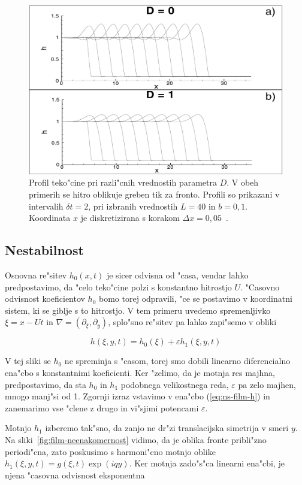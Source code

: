 \documentclass[a4paper,10pt]{article}
\newcommand{\eps}{\varepsilon}
\begin{document}
\begin{figure}[h]
 \centering
 \includegraphics[width=.8\textwidth]{./Slike/film-osnovna-resitev}
 \caption{Profil teko"cine pri razli"cnih vrednostih parametra $D$. V obeh primerih se hitro oblikuje greben tik za fronto. Profili so prikazani v intervalih $\delta t = 2$, pri izbranih vrednostih $L = 40$ in $b=0,1$. Koordinata $x$ je diskretizirana s korakom $\Delta x = 0,05$~\cite{kondic}. }
 \label{fig:film-osnovna}
\end{figure}


\subsection{Nestabilnost}

Osnovna re"sitev $h_0(x, t)$ je sicer odvisna od "casa, vendar lahko predpostavimo, da "celo teko"cine polzi s konstantno hitrostjo $U$. "Casovno odvisnost koeficientov $h_0$ bomo torej odpravili, "ce se postavimo v koordinatni sistem, ki se giblje s to hitrostjo. V tem primeru uvedemo spremenljivko $\xi = x - Ut$ in $\nabla = (\partial_\xi, \partial_y)$, splo"sno re"sitev pa lahko zapi"semo v obliki

\begin{equation}
 h(\xi, y, t) = h_0(\xi) + \eps h_1(\xi, y, t)
\end{equation}

V tej sliki se $h_0$ ne spreminja s "casom, torej smo dobili linearno diferencialno ena"cbo s konstantnimi koeficienti. Ker "zelimo, da je motnja res majhna, predpostavimo, da sta $h_0$ in $h_1$ podobnega velikostnega reda, $\eps$ pa zelo majhen, mnogo manj"si od 1. Zgornji izraz vstavimo v ena"cbo (\ref{eq:ns-film-h}) in zanemarimo vse "clene z drugo in vi"sjimi potencami $\eps$. 

Motnjo $h_1$ izberemo tak"sno, da zanjo ne dr"zi translacijska simetrija v smeri $y$. Na sliki~\ref{fig:film-neenakomernost} vidimo, da je oblika fronte pribli"zno periodi"cna, zato poskusimo s harmoni"cno motnjo oblike $h_1(\xi, y, t) = g(\xi, t) \exp (i q y)$. Ker motnja zado"s"ca linearni ena"cbi, je njena "casovna odvisnost eksponentna
\end{document}
